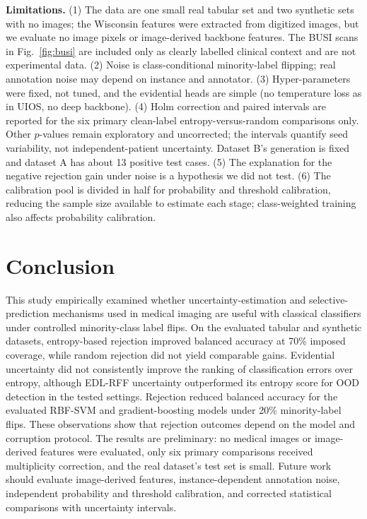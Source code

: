 \documentclass[conference]{IEEEtran}
\begin{document}
\textbf{Limitations.} (1) The data are one small real tabular set and two synthetic sets with no images; the Wisconsin features were extracted from digitized images, but we evaluate no image pixels or image-derived backbone features. The BUSI scans in Fig.~\ref{fig:busi} are included only as clearly labelled clinical context and are not experimental data. (2) Noise is class-conditional minority-label flipping; real annotation noise may depend on instance and annotator. (3) Hyper-parameters were fixed, not tuned, and the evidential heads are simple (no temperature loss as in UIOS, no deep backbone). (4) Holm correction and paired intervals are reported for the six primary clean-label entropy-versus-random comparisons only. Other $p$-values remain exploratory and uncorrected; the intervals quantify seed variability, not independent-patient uncertainty. Dataset B's generation is fixed and dataset A has about 13 positive test cases. (5) The explanation for the negative rejection gain under noise is a hypothesis we did not test. (6) The calibration pool is divided in half for probability and threshold calibration, reducing the sample size available to estimate each stage; class-weighted training also affects probability calibration.

\section{Conclusion}
This study empirically examined whether uncertainty-estimation and selective-prediction mechanisms used in medical imaging are useful with classical classifiers under controlled minority-class label flips. On the evaluated tabular and synthetic datasets, entropy-based rejection improved balanced accuracy at 70\% imposed coverage, while random rejection did not yield comparable gains. Evidential uncertainty did not consistently improve the ranking of classification errors over entropy, although EDL-RFF uncertainty outperformed its entropy score for OOD detection in the tested settings. Rejection reduced balanced accuracy for the evaluated RBF-SVM and gradient-boosting models under 20\% minority-label flips. These observations show that rejection outcomes depend on the model and corruption protocol. The results are preliminary: no medical images or image-derived features were evaluated, only six primary comparisons received multiplicity correction, and the real dataset's test set is small. Future work should evaluate image-derived features, instance-dependent annotation noise, independent probability and threshold calibration, and corrected statistical comparisons with uncertainty intervals.
\end{document}
